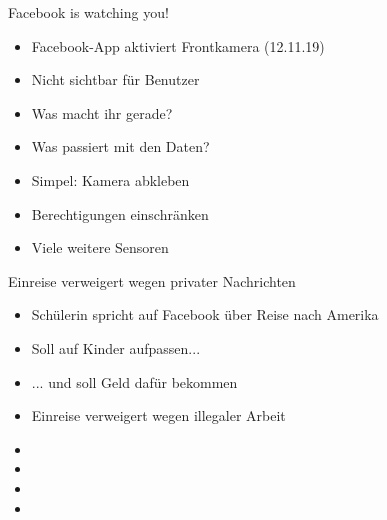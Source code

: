 \documentclass[10pt]{beamer}
\begin{document}
\begin{frame}[fragile]{Facebook is watching you!}
\begin{itemize}
    \item Facebook-App aktiviert Frontkamera (12.11.19)
    \item Nicht sichtbar für Benutzer
    \item Was macht ihr gerade?
    \item Was passiert mit den Daten?
    \item \alert{Simpel: Kamera abkleben}
    \item \alert{Berechtigungen einschränken}
    \item \alert{Viele weitere Sensoren}
  \end{itemize}
\end{frame}

\begin{frame}[fragile]{Einreise verweigert wegen privater Nachrichten}
\begin{itemize}
    \item Schülerin spricht auf Facebook über Reise nach Amerika
    \item Soll auf Kinder aufpassen...
    \item ... und soll Geld dafür bekommen
    \item Einreise verweigert wegen illegaler Arbeit
    \item[]
    \item[]
    \item[]
    \item[]
  \end{itemize}
\end{frame}
\end{document}
